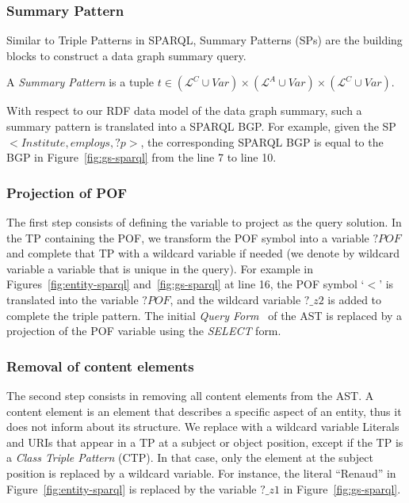 \subsubsection{Summary Pattern}

Similar to Triple Patterns in SPARQL, Summary Patterns (SPs) are the building blocks to construct a data graph summary query.

\begin{definition} 
A \emph{Summary Pattern} is a tuple $t \in  (\mathcal{L}^C \cup Var) \times (\mathcal{L}^A \cup Var) \times (\mathcal{L}^C \cup Var)$.
\label{def:summary-triple-pattern}
\end{definition}

With respect to our RDF data model of the data graph summary, such a summary pattern is translated into a SPARQL BGP. For example, given the SP \mbox{$<Institute, employs, ?p>$}, the corresponding SPARQL BGP is equal to the BGP in Figure~\ref{fig:gs-sparql} from the line 7 to line 10.

\subsubsection{Projection of POF}

The first step consists of defining the variable to project as the query solution. In the TP containing the POF, we transform the POF symbol into a variable $?POF$ and complete that TP with a wildcard variable if needed (we denote by wildcard variable a variable that is unique in the query). For example in Figures~\ref{fig:entity-sparql} and~\ref{fig:gs-sparql} at line 16, the POF symbol `$<$' is translated into the variable $?POF$, and the wildcard variable $?\_z2$ is added to complete the triple pattern.
The initial \emph{Query Form}~\cite{PrudS08} of the AST is replaced by a projection of the POF variable using the \emph{SELECT} form.

\subsubsection{Removal of content elements}

The second step consists in removing all content elements from the AST. A content element is an element that describes a specific aspect of an entity, thus it does not inform about its structure. We replace with a wildcard variable Literals and URIs that appear in a TP at a subject or object position, except if the TP is a \emph{Class Triple Pattern} (CTP). In that case, only the element at the subject position is replaced by a wildcard variable. For instance, the literal ``Renaud'' in Figure~\ref{fig:entity-sparql} is replaced by the variable $?\_z1$ in Figure~\ref{fig:gs-sparql}.

